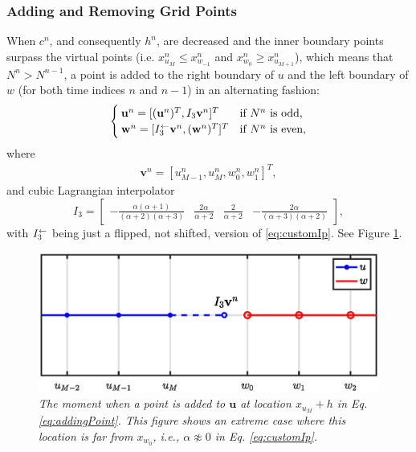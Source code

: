 \subsubsection{Adding and Removing Grid Points}\label{sec:addRemove}
When $c^n$, and consequently $h^n$, are decreased and the inner boundary points surpass the virtual points (i.e. $x_{u_M}^n \leq x_{w_{-1}}^n$ and $x_{w_0}^n \geq x_{u_{M+1}}^n$), which means that $N^n >  N^{n-1}$, a point is added to the right boundary of $u$ and the left boundary of $w$ (for both time indices $n$ and $n-1$) in an alternating fashion: 
\begin{equation}\label{eq:addingPoint}
        \begin{cases}\mathbf{u}^n = [(\mathbf{u}^n)^T, I_3\mathbf{v}^n]^T & \text{if $N^n $ is odd},\\
        \mathbf{w}^n = [I_3^\leftarrow\mathbf{v}^n, (\mathbf{w}^n)^T]^T & \text{if $ N^n$ is even},
        \end{cases}
\end{equation}
where 
\begin{align*}
\mathbf{v}^n = [u_{M-1}^n, u_M^n, w_0^n, w_1^n]^T,%
\end{align*}
and cubic Lagrangian interpolator
\begin{equation}\label{eq:customIp}
    I_3 = \begin{bmatrix} -\frac{\alpha(\alpha+1)}{(\alpha+2)(\alpha+3)} &\frac{2\alpha}{\alpha+2} &\frac{2}{\alpha+2} 
    &-\frac{2\alpha}{(\alpha+3)(\alpha+2)}
    \end{bmatrix},
\end{equation}
with $I_3^\leftarrow$ being just a flipped, not shifted, version of \eqref{eq:customIp}.
See Figure \ref{fig:addingPoint}.
%
\begin{figure}[t]
    \centering
\includegraphics[width=\figwidth\columnwidth]{Figures/addingGridPoint4.eps}
\caption{\label{fig:addingPoint}{\it The moment when a point is added to $\mathbf{u}$ at location $x_{u_M} + h$ in Eq. \eqref{eq:addingPoint}. This figure shows an extreme case where this location is far from $x_{w_0}$, i.e., $\alpha \not\approx 0$ in Eq. \eqref{eq:customIp}.}}
\end{figure}
